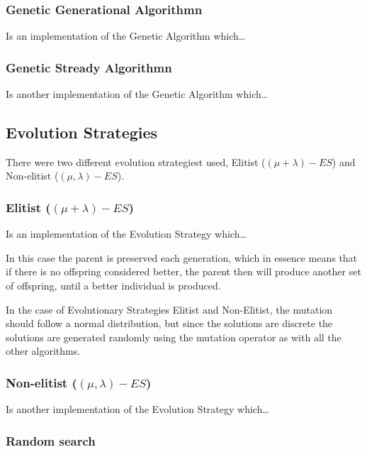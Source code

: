 \subsubsection{Genetic Generational Algorithmn}

Is an implementation of the Genetic Algorithm which\dots

\subsubsection{Genetic Stready Algorithmn}

Is another implementation of the Genetic Algorithm which\dots

\subsection{Evolution Strategies}

There were two different evolution strategiest used, Elitist ($(\mu + \lambda) - ES$) and Non-elitist ($(\mu, \lambda) - ES$).

\subsubsection{Elitist ($(\mu + \lambda) - ES$)}

Is an implementation of the Evolution Strategy which\dots

In this case the parent is preserved each generation, which in essence means that if there is no offspring considered better, the parent then will produce another set of offspring, until a better individual is produced.


In the case of Evolutionary Strategies Elitist and Non-Elitist, the mutation should follow a normal distribution, but since the solutions are discrete the solutions are generated randomly using the mutation operator as with all the other algorithms.

\subsubsection{Non-elitist ($(\mu, \lambda) - ES$)}

Is another implementation of the Evolution Strategy which\dots

\subsubsection{Random search} 

